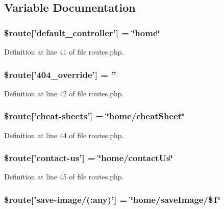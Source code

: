 \subsection{Variable Documentation}
\subsubsection[{\$route}]{\setlength{\rightskip}{0pt plus 5cm}\$route['default\-\_\-controller'] = \char`\"{}home\char`\"{}}\label{routes_8php_a6c2a82e4cec825eb1921141d08af834b}


Definition at line 41 of file routes.\-php.

\subsubsection[{\$route}]{\setlength{\rightskip}{0pt plus 5cm}\$route['404\-\_\-override'] = ''}\label{routes_8php_ad99ba8a90b758dbe982c621c9f27eedc}


Definition at line 42 of file routes.\-php.

\subsubsection[{\$route}]{\setlength{\rightskip}{0pt plus 5cm}\$route['cheat-\/sheets'] = \char`\"{}home/cheat\-Sheet\char`\"{}}\label{routes_8php_a68f9537f20c6adee48d71cd857b01410}


Definition at line 44 of file routes.\-php.

\subsubsection[{\$route}]{\setlength{\rightskip}{0pt plus 5cm}\$route['contact-\/us'] = \char`\"{}home/contact\-Us\char`\"{}}\label{routes_8php_a879b37eb8ab23f146ef5d9c1f99c4156}


Definition at line 45 of file routes.\-php.

\subsubsection[{\$route}]{\setlength{\rightskip}{0pt plus 5cm}\$route['save-\/image/(\-:any)'] = \char`\"{}home/save\-Image/\$1\char`\"{}}\label{routes_8php_ada107d2f4f76b05d59584b97f4620e4e}


